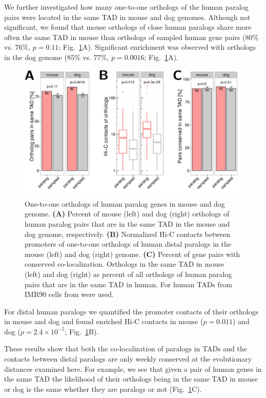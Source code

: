 \documentclass[a4paper,twoside=true,openright,parskip=full,chapterprefix=true,11pt,headings=normal,bibliography=totoc,listof=totoc,titlepage=on,captions=tableabove,draft=false]{scrreprt}
\theoremstyle{definition}
\theoremstyle{definition}
\theoremstyle{definition}
\theoremstyle{remark}
\begin{document}
We further investigated how many one-to-one orthologs of the human
paralog pairs were located in the same TAD in mouse and dog genomes.
Although not significant, we found that mouse orthologs of close human
paralogs share more often the same TAD in mouse than orthologs of
sampled human gene pairs (\(80\%\) vs. \(76\%\), \(p=0.11\);
Fig.~\ref{fig:orthologsMouseDog}A). Significant enrichment was observed
with orthologs in the dog genome (\(85\%\) vs. \(77\%\), \(p=0.0016\);
Fig.~\ref{fig:orthologsMouseDog}A).

\begin{figure}

{\centering \includegraphics[width=0.5\linewidth]{figures/paralog/fig6_09} 

}

\caption{One-to-one orthologs of human paralog genes in
mouse and dog genome. \textbf{(A)} Percent of mouse (left) and dog
(right) orthologs of human paralog pairs that are in the same TAD in the
mouse and dog genome, respectively. \textbf{(B)} Normalized Hi-C
contacts between promoters of one-to-one orthologs of human distal
paralogs in the mouse (left) and dog (right) genome. \textbf{(C)}
Percent of gene pairs with conserved co-localization. Orthologs in the
same TAD in mouse (left) and dog (right) as percent of all orthologs of
human paralog pairs that are in the same TAD in human. For human TADs
from IMR90 cells from \citep{Rao2014} were used.}\label{fig:orthologsMouseDog}
\end{figure}












For distal human paralogs we quantified the promoter contacts of their
orthologs in mouse and dog and found enriched Hi-C contacts in mouse
(\(p=0.011\)) and dog (\(p=2.4\times 10^{-5}\);
Fig.~\ref{fig:orthologsMouseDog}B).

These results show that both the co-localization of paralogs in TADs and
the contacts between distal paralogs are only weekly conserved at the
evolutionary distances examined here. For example, we see that given a
pair of human genes in the same TAD the likelihood of their orthologs
being in the same TAD in mouse or dog is the same whether they are
paralogs or not (Fig.~\ref{fig:orthologsMouseDog}C).
\end{document}
